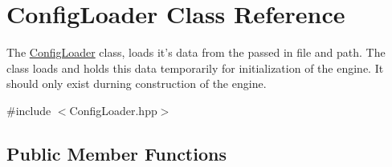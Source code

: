 \hypertarget{class_config_loader}{\section{Config\-Loader Class Reference}
\label{class_config_loader}
}


The \hyperlink{class_config_loader}{Config\-Loader} class, loads it's data from the passed in file and path. The class loads and holds this data temporarily for initialization of the engine. It should only exist durning construction of the engine.  




{\ttfamily \#include $<$Config\-Loader.\-hpp$>$}

\subsection*{Public Member Functions}
